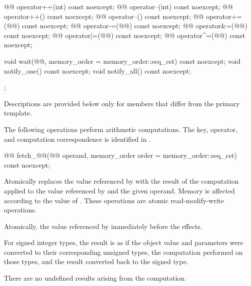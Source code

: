 \begin{codeblock}
{{    @@ operator++(int) const noexcept;
    @@ operator--(int) const noexcept;
    @@ operator++() const noexcept;
    @@ operator--() const noexcept;
    @@ operator+=(@@) const noexcept;
    @@ operator-=(@@) const noexcept;
    @@ operator&=(@@) const noexcept;
    @@ operator|=(@@) const noexcept;
    @@ operator^=(@@) const noexcept;

    void wait(@@, memory_order = memory_order::seq_cst) const noexcept;
    void notify_one() const noexcept;
    void notify_all() const noexcept;
  };
}
\end{codeblock}

\pnum
Descriptions are provided below only for members
that differ from the primary template.

\pnum
The following operations perform arithmetic computations.
The key, operator, and computation correspondence is identified
in .

%
%
%
%
%
\begin{itemdecl}
@@ fetch_@@(@@ operand, memory_order order = memory_order::seq_cst) const noexcept;
\end{itemdecl}

\begin{itemdescr}
\pnum
\effects
Atomically replaces the value referenced by  with
the result of the computation applied to the value referenced by 
and the given operand.
Memory is affected according to the value of .
These operations are atomic read-modify-write operations.

\pnum
\returns
Atomically, the value referenced by 
immediately before the effects.

\pnum
{}%
\remarks
For signed integer types,
the result is as if the object value and parameters
were converted to their corresponding unsigned types,
the computation performed on those types, and
the result converted back to the signed type.
\begin{note}
There are no undefined results arising from the computation.
\end{note}
\end{itemdescr}

